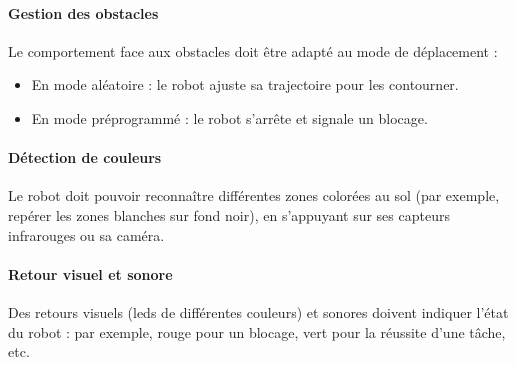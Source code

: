 \paragraph{Gestion des obstacles}
Le comportement face aux obstacles doit être adapté au mode de déplacement :
\begin{itemize}
    \item En mode aléatoire : le robot ajuste sa trajectoire pour les contourner.
    \item En mode préprogrammé : le robot s’arrête et signale un blocage.
\end{itemize}

\paragraph{Détection de couleurs}
Le robot doit pouvoir reconnaître différentes zones colorées au sol (par exemple, repérer les zones blanches sur fond noir), en s’appuyant sur ses capteurs infrarouges ou sa caméra.

\paragraph{Retour visuel et sonore}
Des retours visuels (\acrshort{led}s de différentes couleurs) et sonores doivent indiquer l’état du robot : par exemple, rouge pour un blocage, vert pour la réussite d’une tâche, etc.
